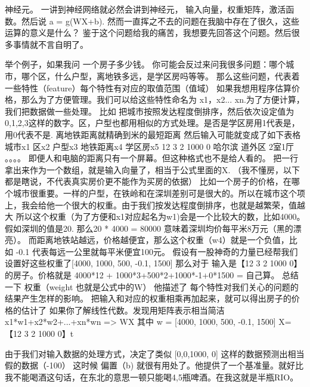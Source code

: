 神经元。
一讲到神经网络就必然会讲到神经元， 输入向量，权重矩阵，激活函数。然后说 a = g(WX+b). 然而一直挥之不去的问题在我脑中存在了很久，这些运算的意义是什么？
鉴于这个问题给我的痛苦，我想要先回答这个问题。然后很多事情就不言自明了。

举个例子，如果我问 一个房子多少钱。 你可能会反过来问我很多问题：哪个城市，哪个区，什么户型，离地铁多远，是学区房吗等等。
那么这些问题，代表着一些特性（feature）每个特性有对应的取值范围（值域）
如果我想用程序估算价格，那么为了方便管理。我们可以给这些特性命名为 x1，x2... xn.为了方便计算，我们把数据做一些处理。
比如 把城市按照发达程度倒排序，然后依次设定值为0,1,2,3这样的数字。区，户型也都用相似的方式处理。是否是学区房用1代表是，用0代表不是. 离地铁距离就精确到米的最短距离
然后输入可能就变成了如下表格
城市x1 区x2 户型x3 地铁距离x4 学区房x5
12     3    2      1000       0
哈尔滨 道外区 2室1厅 
。。。。
即便人和电脑的距离只有一个屏幕。但这种格式也不是给人看的。
把一行拿出来作为一个数组，就是输入向量了，相当于公式里面的X. 
（我不懂房，以下都是瞎说，不代表真实房价更不能作为买房的依据）
比如一个房子的价格，在哪个城市很重要。一样的户型，在铁岭和在深圳差别可是很大的。所以在城市这个项上，我会给他一个很大的权重。由于我们按发达程度倒排序，也就是越繁荣，值越大 所以这个权重（为了方便和x1对应起名为w1)会是一个比较大的数，比如4000。 假如深圳的值是20. 那么20 * 4000 = 80000 意味着深圳均价每平米8万元（黑的漂亮）。
而距离地铁站越远，价格越便宜，那么这个权重（w4）就是一个负值，比如 -0.1 代表每远一公里就每平米便宜100元。
假设有一股神奇的力量已经帮我们设置好这些权重了[4000, 1000, 500, -0.1, 1500] 那么对于 输入是【12     3    2      1000       0】的房子。价格就是 4000*12 + 1000*3+500*2+1000*-1+0*1500 = 自己算。
总结一下 权重（weight 也就是公式中的W） 他描述了 每个特性对我们关心的问题的结果产生怎样的影响。 把输入和对应的权重相乘再加起来，就可以得出房子的价格的估计了
如果你了解线性代数。发现用矩阵表示相当简洁 x1*w1+x2*w2+...+xn*wn => WX 其中 w = [4000, 1000, 500, -0.1, 1500] X= 【12     3    2      1000       0】t

由于我们对输入数据的处理方式，决定了类似 [0,0,1000, 0] 这样的数据预测出相当假的数据（-100） 这时候 偏置（b) 就很有用处了。他提供了一个基准量。就好比我不能喝酒这句话，在东北的意思一顿只能喝4,5瓶啤酒。在我这就是半瓶RIO。

